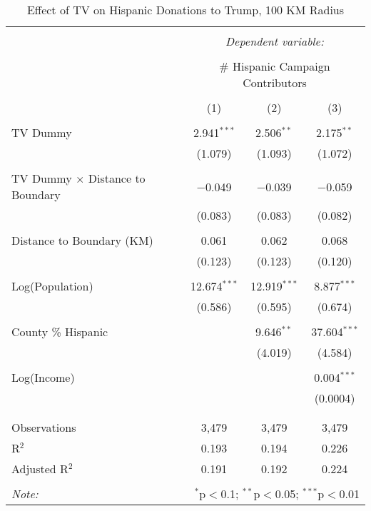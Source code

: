 
\begin{table}[!htbp] \centering 
  \caption{Effect of TV on Hispanic Donations to Trump, 100 KM Radius} 
  \label{} 
\begin{tabular}{@{\extracolsep{-5pt}}lccc} 
\\[-1.8ex]\hline 
\hline \\[-1.8ex] 
 & \multicolumn{3}{c}{\textit{Dependent variable:}} \\ 
\cline{2-4} 
\\[-1.8ex] & \multicolumn{3}{c}{\# Hispanic Campaign Contributors} \\ 
\\[-1.8ex] & (1) & (2) & (3)\\ 
\hline \\[-1.8ex] 
 TV Dummy & 2.941$^{***}$ & 2.506$^{**}$ & 2.175$^{**}$ \\ 
  & (1.079) & (1.093) & (1.072) \\ 
  & & & \\ 
 TV Dummy $\times$ Distance to Boundary  & $-$0.049 & $-$0.039 & $-$0.059 \\ 
  & (0.083) & (0.083) & (0.082) \\ 
  & & & \\ 
 Distance to Boundary (KM) & 0.061 & 0.062 & 0.068 \\ 
  & (0.123) & (0.123) & (0.120) \\ 
  & & & \\ 
 Log(Population) & 12.674$^{***}$ & 12.919$^{***}$ & 8.877$^{***}$ \\ 
  & (0.586) & (0.595) & (0.674) \\ 
  & & & \\ 
 County \% Hispanic &  & 9.646$^{**}$ & 37.604$^{***}$ \\ 
  &  & (4.019) & (4.584) \\ 
  & & & \\ 
 Log(Income) &  &  & 0.004$^{***}$ \\ 
  &  &  & (0.0004) \\ 
  & & & \\ 
\hline \\[-1.8ex] 
Observations & 3,479 & 3,479 & 3,479 \\ 
R$^{2}$ & 0.193 & 0.194 & 0.226 \\ 
Adjusted R$^{2}$ & 0.191 & 0.192 & 0.224 \\ 
\hline 
\hline \\[-1.8ex] 
\textit{Note:}  & \multicolumn{3}{r}{$^{*}$p$<$0.1; $^{**}$p$<$0.05; $^{***}$p$<$0.01} \\ 
\end{tabular} 
\end{table} 
